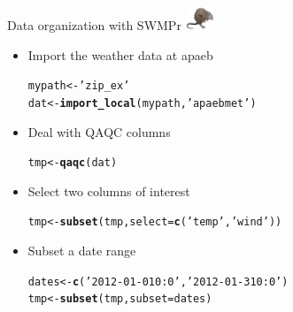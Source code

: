 \documentclass[xcolor=dvipsnames]{beamer}\usepackage[]{graphicx}\usepackage[]{color}
\makeatletter
\newcommand{\hlstr}[1]{\textcolor[rgb]{0.192,0.494,0.8}{#1}}%
\newcommand{\hlstd}[1]{\textcolor[rgb]{0.345,0.345,0.345}{#1}}%
\newcommand{\hlkwb}[1]{\textcolor[rgb]{0.69,0.353,0.396}{#1}}%
\newcommand{\hlkwc}[1]{\textcolor[rgb]{0.333,0.667,0.333}{#1}}%
\newcommand{\hlkwd}[1]{\textcolor[rgb]{0.737,0.353,0.396}{\textbf{#1}}}%
\newenvironment{kframe}{%
 \def\at@end@of@kframe{}%
 \ifinner\ifhmode%
  \def\at@end@of@kframe{\end{minipage}}%
  \begin{minipage}{\columnwidth}%
 \fi\fi%
 \def\FrameCommand##1{\hskip\@totalleftmargin \hskip-\fboxsep
 \colorbox{shadecolor}{##1}\hskip-\fboxsep
     \hskip-\linewidth \hskip-\@totalleftmargin \hskip\columnwidth}%
 \MakeFramed {\advance\hsize-\width
   \@totalleftmargin\z@ \linewidth\hsize
   \@setminipage}}%
 {\par\unskip\endMakeFramed%
 \at@end@of@kframe}
\newenvironment{knitrout}{}{} %
\makeatother
\begin{document}
\begin{frame}[fragile]{Data organization with SWMPr \includegraphics[width = 0.065\textwidth]{imgs/swmprat.png}}
\begin{itemize}
\item {}
Import the weather data at apaeb
\begin{knitrout}\scriptsize
{}\color{fgcolor}\begin{kframe}
\begin{alltt}
\hlstd{mypath} \hlkwb{<-} \hlstr{'zip_ex'}
\hlstd{dat} \hlkwb{<-} \hlkwd{import_local}\hlstd{(mypath,} \hlstr{'apaebmet'}\hlstd{)}
\end{alltt}
\end{kframe}
\end{knitrout}
\vspace{0.1in}
\item {}
Deal with QAQC columns
\begin{knitrout}\scriptsize
{}\color{fgcolor}\begin{kframe}
\begin{alltt}
\hlstd{tmp} \hlkwb{<-} \hlkwd{qaqc}\hlstd{(dat)}
\end{alltt}
\end{kframe}
\end{knitrout}
\vspace{0.1in}
\item {}
Select two columns of interest
\begin{knitrout}\scriptsize
{}\color{fgcolor}\begin{kframe}
\begin{alltt}
\hlstd{tmp} \hlkwb{<-} \hlkwd{subset}\hlstd{(tmp,} \hlkwc{select} \hlstd{=} \hlkwd{c}\hlstd{(}\hlstr{'temp'}\hlstd{,} \hlstr{'wind'}\hlstd{))}
\end{alltt}
\end{kframe}
\end{knitrout}
\vspace{0.1in}
\item {}
Subset a date range
\begin{knitrout}\scriptsize
{}\color{fgcolor}\begin{kframe}
\begin{alltt}
\hlstd{dates} \hlkwb{<-} \hlkwd{c}\hlstd{(}\hlstr{'2012-01-01 0:0'}\hlstd{,} \hlstr{'2012-01-31 0:0'}\hlstd{)}
\hlstd{tmp} \hlkwb{<-} \hlkwd{subset}\hlstd{(tmp,} \hlkwc{subset} \hlstd{= dates)}
\end{alltt}
\end{kframe}
\end{knitrout}
\end{itemize}
\end{frame}
\end{document}
